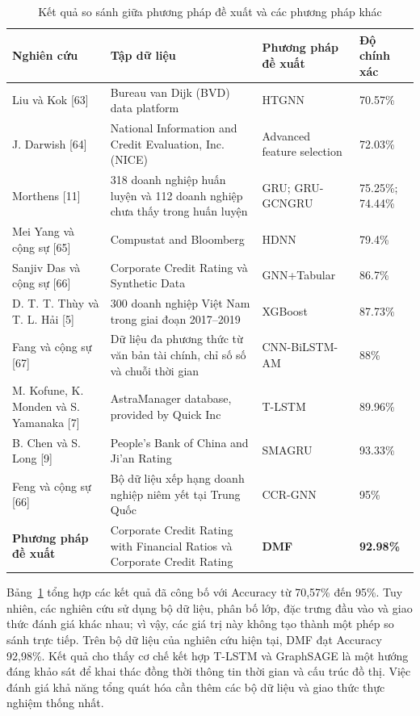 \documentclass[10pt,twoside]{article}
\begin{document}
\begin{table}[!htbp] \centering \caption{Kết quả so sánh giữa phương pháp đề xuất và các phương pháp khác} \label{tab:comparison_proposed_method} \small \renewcommand{\arraystretch}{1.35} \setlength{\tabcolsep}{4pt} \begin{tabular}{|p{3.2cm}|p{5.2cm}|p{3.0cm}|p{2.0cm}|} \hline \textbf{Nghiên cứu} & \textbf{Tập dữ liệu} & \textbf{Phương pháp đề xuất} & \textbf{Độ chính xác} \\ \hline Liu và Kok [63] & Bureau van Dijk (BVD) data platform & HTGNN & 70.57\% \\ \hline J. Darwish [64] & National Information and Credit Evaluation, Inc. (NICE) & Advanced feature selection & 72.03\% \\ \hline Morthens [11] & 318 doanh nghiệp huấn luyện và 112 doanh nghiệp chưa thấy trong huấn luyện & GRU; GRU-GCNGRU & 75.25\%; 74.44\% \\ \hline Mei Yang và cộng sự [65] & Compustat and Bloomberg & HDNN & 79.4\% \\ \hline Sanjiv Das và cộng sự [66] & Corporate Credit Rating và Synthetic Data & GNN+Tabular & 86.7\% \\ \hline D. T. T. Thùy và T. L. Hải [5] & 300 doanh nghiệp Việt Nam trong giai đoạn 2017--2019 & XGBoost & 87.73\% \\ \hline Fang và cộng sự [67] & Dữ liệu đa phương thức từ văn bản tài chính, chỉ số số và chuỗi thời gian & CNN-BiLSTM-AM & 88\% \\ \hline M. Kofune, K. Monden và S. Yamanaka [7] & AstraManager database, provided by Quick Inc & T-LSTM & 89.96\% \\ \hline B. Chen và S. Long [9] & People's Bank of China and Ji'an Rating & SMAGRU & 93.33\% \\ \hline Feng và cộng sự [66] & Bộ dữ liệu xếp hạng doanh nghiệp niêm yết tại Trung Quốc & CCR-GNN & 95\% \\ \hline \textbf{Phương pháp đề xuất} & Corporate Credit Rating with Financial Ratios và Corporate Credit Rating & \textbf{DMF} & \textbf{92.98\%} \\ \hline \end{tabular} \end{table}

Bảng~\ref{tab:comparison_proposed_method} tổng hợp các kết quả đã công bố với Accuracy từ 70,57\% đến 95\%. Tuy nhiên, các nghiên cứu sử dụng bộ dữ liệu, phân bố lớp, đặc trưng đầu vào và giao thức đánh giá khác nhau; vì vậy, các giá trị này không tạo thành một phép so sánh trực tiếp. Trên bộ dữ liệu của nghiên cứu hiện tại, DMF đạt Accuracy 92,98\%. Kết quả cho thấy cơ chế kết hợp T-LSTM và GraphSAGE là một hướng đáng khảo sát để khai thác đồng thời thông tin thời gian và cấu trúc đồ thị. Việc đánh giá khả năng tổng quát hóa cần thêm các bộ dữ liệu và giao thức thực nghiệm thống nhất.
\end{document}

